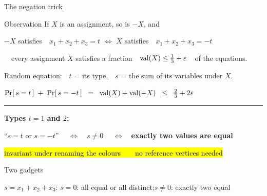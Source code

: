 \begin{frame}{The negation trick}
\vspace{-0.5mm}
\begin{block}{Observation}
If $X$ is an assignment, so is $-X$, and\\[1.2mm]
\centerline{$-X$ satisfies\ \ $x_1+x_2+x_3=t$
\quad$\Longleftrightarrow$\quad
$X$ satisfies\ \ $x_1+x_2+x_3=-t$}
\end{block}
\pause
\vspace{1.2mm}
\ \ every assignment $X$ satisfies a fraction\ \ $\mathrm{val}(X)\le\frac13+\varepsilon$\ \ of the equations.\par
\vspace{0.6mm}
Random equation:\ \ $t$ = its type,\ \ $s$ = the sum of its variables under $X$.
\par\vspace{2mm}
\centerline{$\Pr[\,s=t\,]\;+\;\Pr[\,s=-t\,]\;\;=\;\;\mathrm{val}(X)+\mathrm{val}(-X)\;\;\le\;\;\tfrac23+2\varepsilon$}
\pause
\vspace{2.6mm}
{\color{acc!35}\rule{\linewidth}{0.5pt}}\par
\vspace{1.4mm}
\textbf{Types $t=1$ and $2$:}
\par\vspace{1.6mm}
\centerline{``$s=t$ or $s=-t$''
\ \ $\Longleftrightarrow$\ \ $s\neq0$
\ \ $\Longleftrightarrow$\ \ \textbf{exactly two values are equal}\ \ \pIIItwoeq}
\par\vspace{2mm}
\centerline{\hl{invariant under renaming the colours\ \ \pIIIto\ \ no reference vertices needed}}
\end{frame}

\begin{frame}{Two gadgets}
\centering
\vspace{0.5mm}
\par
\vspace{3.4mm}
{\small\color{soft}$s=x_1+x_2+x_3$:\quad
$s=0$: all equal or all distinct;\quad $s\neq0$: exactly two equal}
\end{frame}

